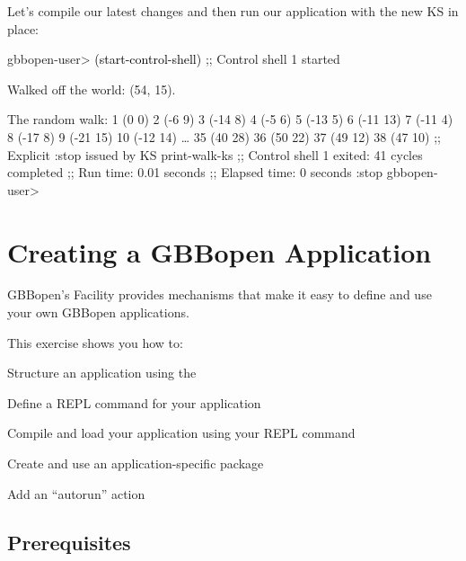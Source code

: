 \documentclass[10pt,twoside,english,pdftex]{article}
\begin{document}
Let's compile our latest changes and then run our application with the new
 KS in place:
%
\W\supp
\begin{example}
\textcolor{darkergray}{%
  gbbopen-user> \textcolor{black}{(start-control-shell)}
  ;; Control shell 1 started

  Walked off the world: (54, 15).

  The random walk:
  1 (0 0)
  2 (-6 9)
  3 (-14 8)
  4 (-5 6)
  5 (-13 5)
  6 (-11 13)
  7 (-11 4)
  8 (-17 8)
  9 (-21 15)
  10 (-12 14)
     \textrm{\ldots{}}
  35 (40 28)
  36 (50 22)
  37 (49 12)
  38 (47 10)
  ;; Explicit :stop issued by KS print-walk-ks
  ;; Control shell 1 exited: 41 cycles completed
  ;; Run time: 0.01 seconds
  ;; Elapsed time: 0 seconds
  :stop
  gbbopen-user>}
\end{example}


\T\markright{}%
\T\pagestyle{plain}
\T\cleardoublepage
\W{}
\T\pagestyle{fancy}
\T\thispagestyle{fancybottom}
\T\renewcommand{\headrulewidth}{0pt}
\section{Creating a GBBopen Application}
\label{sec:application}%

GBBopen's  Facility provides
mechanisms that make it easy to define and use your own GBBopen applications.

\fndocrule

This exercise shows you how to:
\begin{tightitemize}
\item Structure an application using the 
\item Define a REPL command for your application
\item Compile and load your application using your REPL command
\item Create and use an application-specific package
\item Add an ``autorun'' action
\end{tightitemize}

\fndocrule

\subsection*{Prerequisites}
\end{document}
